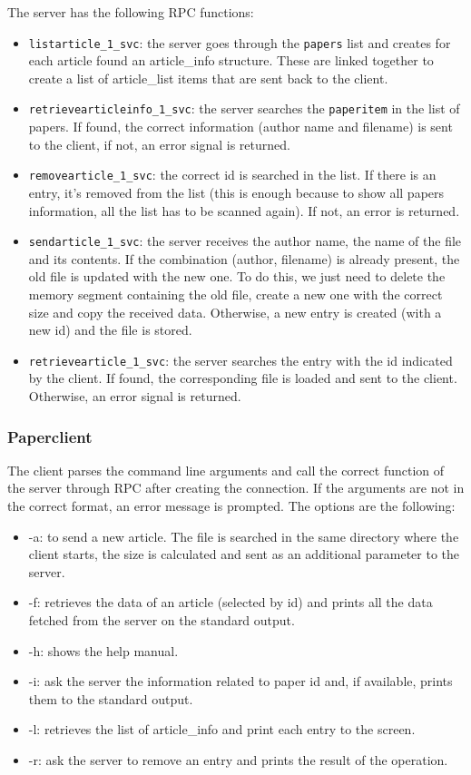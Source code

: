 The server has the following RPC functions:
\begin{itemize}
\item \texttt{listarticle\_1\_svc}: the server goes through the \texttt{papers} list and creates for each article found an article\_info structure. These are linked together to create a list of article\_list items that are sent back to the client.
\item \texttt{retrievearticleinfo\_1\_svc}: the server searches the \texttt{paperitem} in the list of papers. If found, the correct information (author name and filename) is sent to the client, if not, an error signal is returned.
\item \texttt{removearticle\_1\_svc}: the correct id is searched in the list. If there is an entry, it's removed from the list (this is enough because to show all papers information, all the list has to be scanned again). If not, an error is returned.
\item \texttt{sendarticle\_1\_svc}: the server receives the author name, the name of the file and its contents. If the combination (author, filename) is already present, the old file is updated with the new one. To do this, we just need to delete the memory segment containing the old file, create a new one with the correct size and copy the received data. Otherwise, a new entry is created (with a new id) and the file is stored.
\item \texttt{retrievearticle\_1\_svc}: the server searches the entry with the id indicated by the client. If found, the corresponding file is loaded and sent to the client. Otherwise, an error signal is returned.
\end{itemize}


\subsubsection{Paperclient}
The client parses the command line arguments and call the correct function of the server through RPC after creating the connection. If the arguments are not in the correct format, an error message is prompted. The options are the following:
\begin{itemize}
	\item -a: to send a new article. The file is searched in the same directory where the client starts, the size is calculated and sent as an additional parameter to the server.
	\item -f: retrieves the data of an article (selected by id) and prints all the data fetched from the server on the standard output.
	\item -h: shows the help manual.
	\item -i: ask the server the information related to paper id and, if available, prints them to the standard output.
	\item -l: retrieves the list of article\_info and print each entry to the screen.
	\item -r: ask the server to remove an entry and prints the result of the operation.
\end{itemize}

